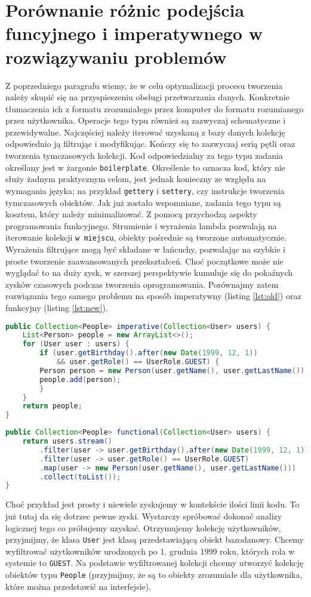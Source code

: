 \documentclass[a4paper,10pt]{report}
\begin{document}
\section{Porównanie różnic podejścia funcyjnego i imperatywnego w rozwiązywaniu problemów}
Z poprzedniego paragrafu wiemy, że w celu optymalizacji procesu tworzenia należy skupić się na przyspieszeniu obsługi przetwarzania danych. Konkretnie tłumaczenia ich z formatu zrozumiałego przez komputer do formatu rozumianego przez użytkownika. Operacje tego typu również są zazwyczaj schematyczne i przewidywalne. Najczęściej należy iterować uzyskaną z bazy danych kolekcję odpowiednio ją filtrując i modyfikując. Kończy się to zazwyczaj serią pętli oraz tworzenia tymczasowych kolekcji. Kod odpowiedzialny za tego typu zadania określany jest w żargonie \verb|boilerplate|. Określenie to oznacza kod, który nie służy żadnym praktycznym celom, jest jednak konieczny ze względu na wymagania języka; na przykład \verb|gettery| i \verb|settery|, czy instrukcje tworzenia tymczasowych obiektów. Jak już zostało wspomniane, zadania tego typu są kosztem, który należy minimalizować. Z pomocą przychodzą aspekty programowania funkcyjnego. Strumienie i wyrażenia lambda pozwalają na iterowanie kolekcji \verb|w miejscu|, obiekty pośrednie są tworzone automatycznie. Wyrażenia filtrujące mogą być składane w łańcuchy, pozwalając na szybkie i proste tworzenie zaawansowanych przekształceń. Choć początkowe może nie wyglądać to na duży zysk, w szerszej perspektywie kumuluje się do pokaźnych zysków czasowych podczas tworzenia oprogramowania. Porównajmy zatem rozwiązania tego samego problemu na sposób imperatywny (listing \ref{lst:old}) oraz funkcyjny (listing \ref{lst:new}).
\begin{lstlisting}[caption={Podejście imperatywne},label={lst:old},language=Java]
public Collection<People> imperative(Collection<User> users) {
	List<Person> people = new ArrayList<>();
	for (User user : users) {
		if (user.getBirthday().after(new Date(1999, 12, 1))
		    && user.getRole() == UserRole.GUEST) {
	    Person person = new Person(user.getName(), user.getLastName());
	    people.add(person);
	    }
	}
	return people;
}
\end{lstlisting}
\begin{lstlisting}[caption={Podejście funkcyjne},label={lst:new},language=Java]
public Collection<People> functional(Collection<User> users) {
	return users.stream()
	    .filter(user -> user.getBirthday().after(new Date(1999, 12, 1)))
	    .filter(user -> user.getRole() == UserRole.GUEST)
	    .map(user -> new Person(user.getName(), user.getLastName()))
	    .collect(toList());
}
\end{lstlisting}
Choć przykład jest prosty i niewiele zyskujemy w kontekście ilości linii kodu. To już tutaj da się dotrzec pewne zyski. Wystarczy spróbować dokonać analizy logicznej tego co próbujemy uzyskać. Otrzymujemy kolekcję użytkowników, przyjmijmy, że klasa \verb|User| jest klasą przedstawiającą obiekt bazodanowy. Chcemy wyfiltrować użytkowników urodzonych po 1. grudnia 1999 roku, których rola w systemie to \verb|GUEST|. Na podstawie wyfiltrowanej kolekcji chcemy utworzyć kolekcję obiektów typu \verb|People| (przyjmijmy, że są to obiekty zrozumiałe dla użytkownika, które można przedstawić na interfejsie).
\end{document}
